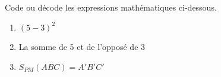 %
%
    Code ou décode les expressions mathématiques ci-dessous.
    \begin{enumerate}[itemsep=1.5cm, after=\vspace*{1cm}]
        \item \((5-3)^2\)
        \item La somme de 5 et de l'opposé de 3
        \item \(S_{PM}(ABC) = A'B'C'\) \vspace*{2cm}
    \end{enumerate}
